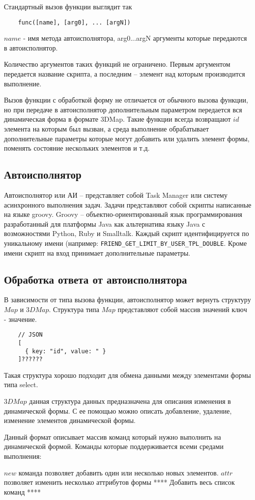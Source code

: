 \documentclass[../index.tex]{subfiles}
\begin{document}
Стандартный вызов функции выглядит так
\begin{verbatim}
    func([name], [arg0], ... [argN])
\end{verbatim}

$name$ - имя метода автоисполнятора, arg0...argN аргументы которые передаются в автоисполнятор.

Количество аргументов таких функций не ограничено. Первым аргументом передается название скрипта, 
а последним -- элемент над которым производится выполнение.

Вызов функции с обработкой форму не отличается от обычного вызова функции, но при передаче в автоисполнятор
дополнительным параметром передается вся динамическая форма в формате 3DMap. 
Такие функции всегда возвращают $id$ элемента на которым был вызван, а среда выполнение обрабатывает 
дополнительные параметры которые могут добавить или удалить элемент формы, поменять состояние нескольких элементов
и т.д.  

\subsection{Автоисполнятор}

Автоисполнятор или АИ -- представляет собой Task Manager или систему асинхронного выполнения задач. 
Задачи представляют собой скрипты написанные на языке groovy. 
Groovy -- объектно-ориентированный язык программирования разработанный для платформы 
Java как альтернатива языку Java с возможностями Python, Ruby и Smalltalk. 
Каждый скрипт идентифицируется по уникальному имени (например: \verb|FRIEND_GET_LIMIT_BY_USER_TPL_DOUBLE|. 
Кроме имени скрипт на вход принимает дополнительные параметры. 

\subsection{Обработка ответа от автоисполнятора}

В зависимости от типа вызова функции, автоисполнятор может вернуть структуру $Map$ и $3DMap$.
Структура типа $Map$ представляют собой массив значений $ключ$ - $значение$.

\begin{verbatim}
    // JSON 
    [
      { key: "id", value: " }
    ]??????
\end{verbatim}

Такая структура хорошо подходит для обмена данными между элементами формы типа select.

$3DMap$ данная структура данных предназначена для описания изменения в динамической формы.
С ее помощью можно описать добавление, удаление, изменение элементов динамической формы.

Данный формат описывает массив команд который нужно выполнить на динамической формой.
Команды которые поддерживается всеми средами выполнения:

$new$ команда позволяет добавить один или несколько новых элементов.
$attr$ позволяет изменить несколько аттрибутов формы
**** Добавить весь список команд **** 
\end{document}
